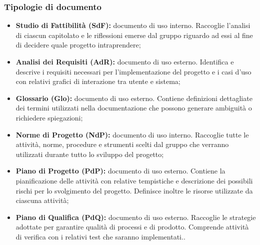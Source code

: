 \subsubsection{Tipologie di documento}
\begin{itemize}
	\item \textbf{Studio di Fattibilità (SdF): } documento di uso interno. Raccoglie l'analisi di ciascun capitolato e le riflessioni emerse dal gruppo riguardo ad essi al fine di decidere quale progetto intraprendere;
	
	\item \textbf{Analisi dei Requisiti (AdR): } documento di uso esterno. Identifica e descrive i requisiti necessari per l’implementazione del progetto e i casi d’uso con relativi grafici di interazione tra utente e sistema;
	
	\item \textbf{Glossario (Glo): } documento di uso esterno. Contiene definizioni dettagliate dei termini utilizzati nella documentazione che possono generare ambiguità o richiedere spiegazioni;
	
	\item \textbf{Norme di Progetto (NdP): } documento di uso interno. Raccoglie tutte le attività, norme, procedure e strumenti scelti dal gruppo che verranno utilizzati durante tutto lo sviluppo del progetto;
	
	\item \textbf{Piano di Progetto (PdP): } documento di uso esterno. Contiene la pianificazione delle attività con relative tempistiche e descrizione dei possibili rischi per lo svolgimento del progetto. Definisce inoltre le risorse utilizzate da ciascuna attività;
	
	\item \textbf{Piano di Qualifica (PdQ): } documento di uso esterno. Raccoglie le strategie adottate per garantire qualità di processi e di prodotto. Comprende attività di verifica con i relativi test che saranno implementati..
\end{itemize}


